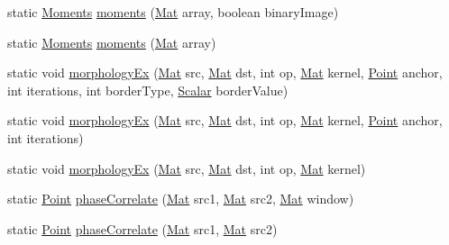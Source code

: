 \begin{DoxyCompactItemize}
\item 
static \mbox{\hyperlink{classorg_1_1opencv_1_1imgproc_1_1_moments}{Moments}} \mbox{\hyperlink{classorg_1_1opencv_1_1imgproc_1_1_imgproc_a6739d6b48d3c77c9a2225f0f2b8c2de0}{moments}} (\mbox{\hyperlink{classorg_1_1opencv_1_1core_1_1_mat}{Mat}} array, boolean binary\+Image)
\item 
static \mbox{\hyperlink{classorg_1_1opencv_1_1imgproc_1_1_moments}{Moments}} \mbox{\hyperlink{classorg_1_1opencv_1_1imgproc_1_1_imgproc_a7c002c128b749bd96ce843ae73165e6e}{moments}} (\mbox{\hyperlink{classorg_1_1opencv_1_1core_1_1_mat}{Mat}} array)
\item 
static void \mbox{\hyperlink{classorg_1_1opencv_1_1imgproc_1_1_imgproc_a72708dff026d005db5a9534c9b2b4aae}{morphology\+Ex}} (\mbox{\hyperlink{classorg_1_1opencv_1_1core_1_1_mat}{Mat}} src, \mbox{\hyperlink{classorg_1_1opencv_1_1core_1_1_mat}{Mat}} dst, int op, \mbox{\hyperlink{classorg_1_1opencv_1_1core_1_1_mat}{Mat}} kernel, \mbox{\hyperlink{classorg_1_1opencv_1_1core_1_1_point}{Point}} anchor, int iterations, int border\+Type, \mbox{\hyperlink{classorg_1_1opencv_1_1core_1_1_scalar}{Scalar}} border\+Value)
\item 
static void \mbox{\hyperlink{classorg_1_1opencv_1_1imgproc_1_1_imgproc_aae5c49b2ab2f81167240972412b5413c}{morphology\+Ex}} (\mbox{\hyperlink{classorg_1_1opencv_1_1core_1_1_mat}{Mat}} src, \mbox{\hyperlink{classorg_1_1opencv_1_1core_1_1_mat}{Mat}} dst, int op, \mbox{\hyperlink{classorg_1_1opencv_1_1core_1_1_mat}{Mat}} kernel, \mbox{\hyperlink{classorg_1_1opencv_1_1core_1_1_point}{Point}} anchor, int iterations)
\item 
static void \mbox{\hyperlink{classorg_1_1opencv_1_1imgproc_1_1_imgproc_a1acac72fef3b7b66641f4c2e9cd5e876}{morphology\+Ex}} (\mbox{\hyperlink{classorg_1_1opencv_1_1core_1_1_mat}{Mat}} src, \mbox{\hyperlink{classorg_1_1opencv_1_1core_1_1_mat}{Mat}} dst, int op, \mbox{\hyperlink{classorg_1_1opencv_1_1core_1_1_mat}{Mat}} kernel)
\item 
static \mbox{\hyperlink{classorg_1_1opencv_1_1core_1_1_point}{Point}} \mbox{\hyperlink{classorg_1_1opencv_1_1imgproc_1_1_imgproc_a7b3ed66ff7c6ceb76fb1293177964dd1}{phase\+Correlate}} (\mbox{\hyperlink{classorg_1_1opencv_1_1core_1_1_mat}{Mat}} src1, \mbox{\hyperlink{classorg_1_1opencv_1_1core_1_1_mat}{Mat}} src2, \mbox{\hyperlink{classorg_1_1opencv_1_1core_1_1_mat}{Mat}} window)
\item 
static \mbox{\hyperlink{classorg_1_1opencv_1_1core_1_1_point}{Point}} \mbox{\hyperlink{classorg_1_1opencv_1_1imgproc_1_1_imgproc_af0784f3b7aa341ba480c44509319440c}{phase\+Correlate}} (\mbox{\hyperlink{classorg_1_1opencv_1_1core_1_1_mat}{Mat}} src1, \mbox{\hyperlink{classorg_1_1opencv_1_1core_1_1_mat}{Mat}} src2)

\end{DoxyCompactItemize}
